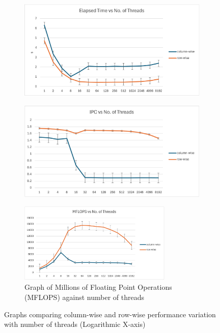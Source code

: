 \documentclass{article}
\begin{document}
\begin{figure}[H]
	\centering
	\begin{subfigure}{0.5\textwidth}
		\centering
		\includegraphics[width=0.8\linewidth]{timeElapsedRowWise.png}
		\label{fig:timeGraphRowWise}
	\end{subfigure}%
	\begin{subfigure}{0.5\textwidth}
		\centering
		\includegraphics[width=0.8\linewidth]{ipcRowWise.png}
		\label{fig:ipcGraphRowWise}
	\end{subfigure}%
	\newline
	\begin{subfigure}{0.5\textwidth}
		\centering
		\includegraphics[width=0.8\textwidth]{mflopsRowWise.png}
		\caption{Graph of Millions of Floating Point Operations (MFLOPS) against number of threads}
		\label{fig:mflopsGraphRowWise}
	\end{subfigure}
	\caption{Graphs comparing column-wise and row-wise performance variation with number of threads (Logarithmic X-axis)}
	\label{fig:graphsRowWise}
\end{figure}
\end{document}
